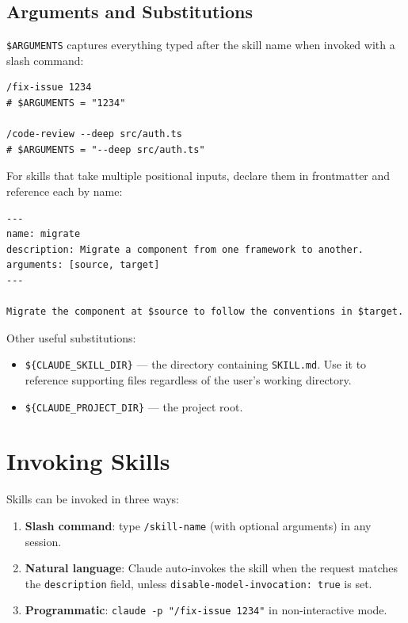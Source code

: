 \subsection{Arguments and Substitutions}


\texttt{\$ARGUMENTS} captures everything typed after the skill name when
invoked with a slash command:

\begin{lstlisting}[caption={Invoking a skill with arguments}]
/fix-issue 1234
# $ARGUMENTS = "1234"

/code-review --deep src/auth.ts
# $ARGUMENTS = "--deep src/auth.ts"
\end{lstlisting}

For skills that take multiple positional inputs, declare them in
frontmatter and reference each by name:

\begin{lstlisting}[caption={Named arguments via the \texttt{arguments} field}]
---
name: migrate
description: Migrate a component from one framework to another.
arguments: [source, target]
---

Migrate the component at $source to follow the conventions in $target.
\end{lstlisting}

Other useful substitutions:

\begin{itemize}
  \item \texttt{\$\{CLAUDE\_SKILL\_DIR\}} — the directory containing
        \texttt{SKILL.md}. Use it to reference supporting files
        regardless of the user's working directory.
  \item \texttt{\$\{CLAUDE\_PROJECT\_DIR\}} — the project root.
\end{itemize}

\section{Invoking Skills}
\label{sec:skill-invoke}


Skills can be invoked in three ways:

\begin{enumerate}
  \item \textbf{Slash command}: type \texttt{/skill-name} (with optional
        arguments) in any session.
  \item \textbf{Natural language}: Claude auto-invokes the skill when the
        request matches the \texttt{description} field, unless
        \texttt{disable-model-invocation: true} is set.
  \item \textbf{Programmatic}: \texttt{claude -p "/fix-issue 1234"} in
        non-interactive mode.
\end{enumerate}


